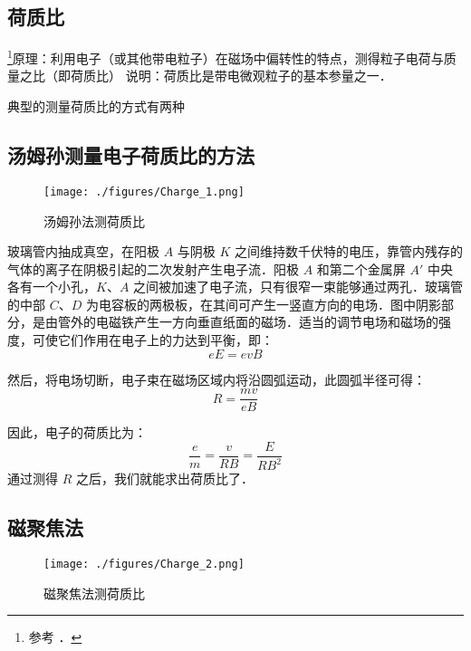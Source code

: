 

\subsection{荷质比}
\footnote{参考 \cite{新电}．}原理：利用电子（或其他带电粒子）在磁场中偏转性的特点，测得粒子电荷与质量之比（即荷质比）
说明：荷质比是带电微观粒子的基本参量之一．

典型的测量荷质比的方式有两种

\subsection{汤姆孙测量电子荷质比的方法}

\begin{figure}[ht]
\centering
\texttt{[image: ./figures/Charge\_1.png]}
\caption{汤姆孙法测荷质比} \label{Charge_fig1}
\end{figure}

玻璃管内抽成真空，在阳极 $A$ 与阴极 $K$ 之间维持数千伏特的电压，靠管内残存的气体的离子在阴极引起的二次发射产生电子流．阳极 $A$ 和第二个金属屏 $A'$ 中央各有一个小孔，$K$、$A$ 之间被加速了电子流，只有很窄一束能够通过两孔．玻璃管的中部 $C$、$D$ 为电容板的两极板，在其间可产生一竖直方向的电场．图中阴影部分，是由管外的电磁铁产生一方向垂直纸面的磁场．适当的调节电场和磁场的强度，可使它们作用在电子上的力达到平衡，即：
\begin{equation}
eE=evB
\end{equation}

然后，将电场切断，电子束在磁场区域内将沿圆弧运动，此圆弧半径可得：
\begin{equation}
R=\frac {mv}{eB}
\end{equation}

因此，电子的荷质比为：
\begin{equation}
\frac{e}{m}=\frac{v}{RB}=\frac {E}{RB^2}
\end{equation}
通过测得 $R$ 之后，我们就能求出荷质比了．

\subsection{磁聚焦法}

\begin{figure}[ht]
\centering
\texttt{[image: ./figures/Charge\_2.png]}
\caption{磁聚焦法测荷质比} \label{Charge_fig2}
\end{figure}

